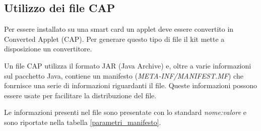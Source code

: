 \subsection{Utilizzo dei file CAP}
\label{cap}
Per essere installato su una smart card un applet deve essere convertito in Converted Applet (CAP). Per generare questo tipo di file il kit mette a disposizione un convertitore.


Un file CAP utilizza il formato JAR (Java Archive) e, oltre a varie informazioni sul pacchetto Java, contiene un manifesto (\textit{META-INF/MANIFEST.MF}) che fonrnisce una serie di informazioni riguardanti il file. Queste informazioni possono essere usate per facilitare la distribuzione del file.

Le informazioni presenti nel file sono presentate con lo standard \textit{nome:valore} e sono riportate nella tabella \ref{parametri_manifesto}.

